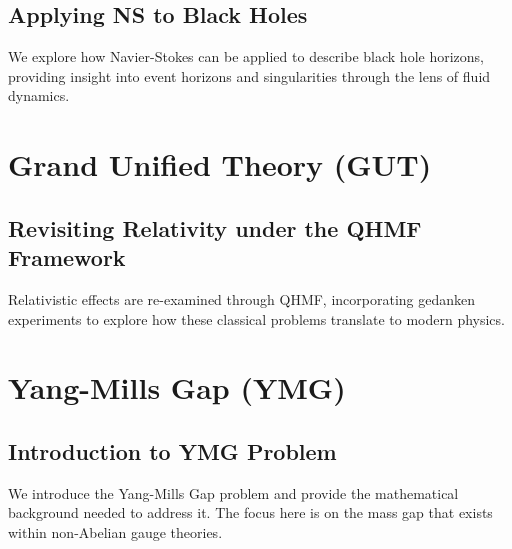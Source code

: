 \documentclass[12pt]{article}
\begin{document}
\subsection{Applying NS to Black Holes}
We explore how Navier-Stokes can be applied to describe black hole horizons, providing insight into event horizons and singularities through the lens of fluid dynamics.

\section{Grand Unified Theory (GUT)}
\subsection{Revisiting Relativity under the QHMF Framework}
Relativistic effects are re-examined through QHMF, incorporating gedanken experiments to explore how these classical problems translate to modern physics.

\section{Yang-Mills Gap (YMG)}
\subsection{Introduction to YMG Problem}
We introduce the Yang-Mills Gap problem and provide the mathematical background needed to address it. The focus here is on the mass gap that exists within non-Abelian gauge theories.
\end{document}
